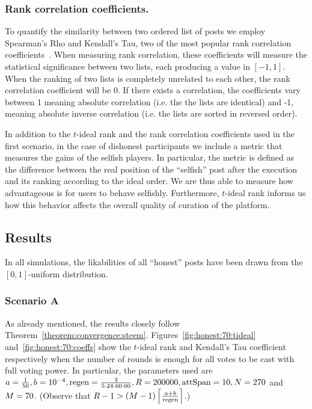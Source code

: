     \subsubsection*{Rank correlation coefficients.}
      To quantify the similarity between two ordered list of posts we employ
      Spearman's Rho and Kendall's Tau, two of the most popular rank correlation
      coefficients~\cite{kendall1955rank}. When measuring rank correlation,
      these coefficients will measure the statistical significance between two
      lists, each producing a value in $\left[-1, 1\right]$. When the ranking of
      two lists is completely unrelated to each other, the rank correlation
      coefficient will be 0. If there exists a correlation, the coefficients
      vary between 1 meaning absolute correlation (i.e. the the lists are
      identical) and -1, meaning absolute inverse correlation (i.e. the lists
      are sorted in reversed order).

    In addition to the $t$-ideal rank and the rank correlation coefficients used
    in the first scenario, in the case of dishonest participants we include a
    metric that measures the gains of the selfish players. In particular, the
    metric is defined as the difference between the real position of the
    ``selfish'' post after the execution and its ranking according to the ideal
    order. We are thus able to measure how advantageous is for users to behave
    selfishly. Furthermore, $t$-ideal rank informs us how this behavior affects
    the overall quality of curation of the platform.

  \subsection{Results}
    In all simulations, the likabilities of all ``honest'' posts have been drawn
    from the $\left[0, 1\right]$-uniform distribution.

    \subsubsection*{Scenario A}
      As already mentioned, the results closely follow
      Theorem~\ref{theorem:convergence:steem}.
      Figures~\ref{fig:honest:70:tideal} and~\ref{fig:honest:70:coeffs} show the
      $t$-ideal rank and Kendall's Tau coefficient respectively when the number
      of rounds is enough for all votes to be cast with full voting power. In
      particular, the parameters used are $a = \frac{1}{50}, b = 10^{-4}, \regen
      = \frac{3}{5 \cdot 24 \cdot 60 \cdot 60}, \rounds = 200000, \attspan = 10,
      \playerlen = 270$ and $\postlen = 70$. (Observe that $\rounds - 1 >
      \left(\postlen - 1\right)\ceil*{\frac{a + b}{\regen}}$.)

